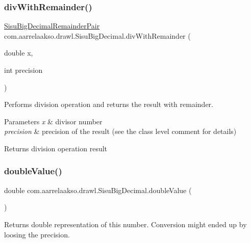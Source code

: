 \subsubsection{\texorpdfstring{div\+With\+Remainder()}{divWithRemainder()}\hspace{0.1cm}{\footnotesize\ttfamily [2/2]}}
{\footnotesize\ttfamily \hyperlink{classcom_1_1aarrelaakso_1_1drawl_1_1_sisu_big_decimal_remainder_pair}{Sisu\+Big\+Decimal\+Remainder\+Pair} com.\+aarrelaakso.\+drawl.\+Sisu\+Big\+Decimal.\+div\+With\+Remainder (\begin{DoxyParamCaption}\item[{double}]{x,  }\item[{int}]{precision }\end{DoxyParamCaption})\hspace{0.3cm}{\ttfamily [protected]}}

Performs division operation and returns the result with remainder.


\begin{DoxyParams}{Parameters}
{\em x} & divisor number \\
\hline
{\em precision} & precision of the result (see the class level comment for details) \\
\hline
\end{DoxyParams}
\begin{DoxyReturn}{Returns}
division operation result 
\end{DoxyReturn}
\mbox{\label{classcom_1_1aarrelaakso_1_1drawl_1_1_sisu_big_decimal_a4b69c8b90193583069b152ffa4fec2a6}} 
\subsubsection{\texorpdfstring{double\+Value()}{doubleValue()}}
{\footnotesize\ttfamily double com.\+aarrelaakso.\+drawl.\+Sisu\+Big\+Decimal.\+double\+Value (\begin{DoxyParamCaption}{ }\end{DoxyParamCaption})\hspace{0.3cm}{\ttfamily [protected]}}

Returns double representation of this number. Conversion might ended up by loosing the precision.


